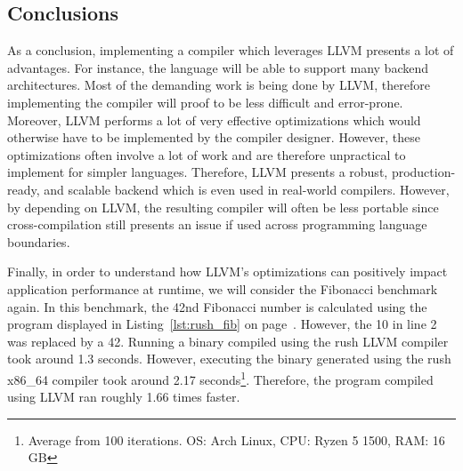 \subsection{Conclusions}

As a conclusion, implementing a compiler which leverages LLVM presents a lot of advantages.
For instance, the language will be able to support many backend architectures.
Most of the demanding work is being done by LLVM, therefore implementing the compiler will proof to be less difficult and error-prone.
Moreover, LLVM performs a lot of very effective optimizations which would otherwise have to be implemented by the compiler designer.
However, these optimizations often involve a lot of work and are therefore unpractical to implement for simpler languages.
Therefore, LLVM presents a robust, production-ready, and scalable backend which is even used in real-world compilers.
However, by depending on LLVM, the resulting compiler will often be less portable since cross-compilation still presents an issue if used across programming language boundaries.

Finally, in order to understand how LLVM's optimizations can positively impact application performance at runtime, we will consider the Fibonacci benchmark again.
In this benchmark, the 42nd Fibonacci number is calculated using the program displayed in Listing~\ref{lst:rush_fib} on page~\pageref{lst:rush_fib}.
However, the 10 in line 2 was replaced by a 42.
Running a binary compiled using the rush LLVM compiler took around 1.3 seconds.
However, executing the binary generated using the rush x86\_64 compiler took around 2.17 seconds\footnote{Average from 100 iterations. OS: Arch Linux, CPU: Ryzen 5 1500, RAM: 16 GB}.
Therefore, the program compiled using LLVM ran roughly 1.66 times faster.

